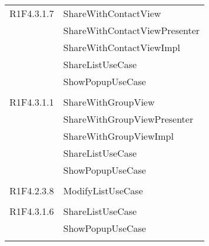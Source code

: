 \begin{center}
\begin{longtable}{|p{7cm}|p{5cm}|}
		R1F4.3.1.7 & ShareWithContactView \\ & ShareWithContactViewPresenter \\ & ShareWithContactViewImpl \\ & ShareListUseCase \\ & ShowPopupUseCase \\ & \\ \hline
		R1F4.3.1.1 & ShareWithGroupView \\ & ShareWithGroupViewPresenter \\ & ShareWithGroupViewImpl \\ & ShareListUseCase \\ & ShowPopupUseCase \\ & \\ \hline
		R1F4.2.3.8 & ModifyListUseCase \\ & \\ \hline
		R1F4.3.1.6 & ShareListUseCase \\ & ShowPopupUseCase \\ & \\ \hline
	\end{longtable}
\end{center}
